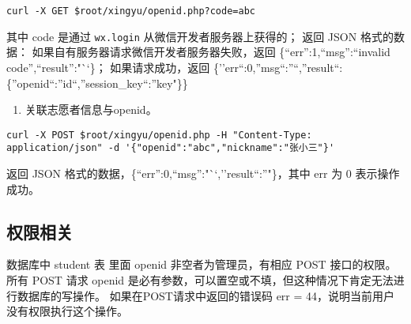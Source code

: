 \documentclass[]{article}
\providecommand{\tightlist}{%
  \setlength{\itemsep}{0pt}\setlength{\parskip}{0pt}}
\begin{document}
\begin{verbatim}
curl -X GET $root/xingyu/openid.php?code=abc
\end{verbatim}

其中 code 是通过 \texttt{wx.login} 从微信开发者服务器上获得的； 返回
JSON 格式的数据： 如果自有服务器请求微信开发者服务器失败，返回
\{``err'':1,``msg'':``invalid code'',``result'':"``\}；
如果请求成功，返回
\{''err``:0,''msg``:''``,''result``:\{''openid``:''id``,''session\_key``:''key"\}\}

\begin{enumerate}
\def\labelenumi{\arabic{enumi}.}
\setcounter{enumi}{1}
\tightlist
\item
  关联志愿者信息与openid。
\end{enumerate}

\begin{verbatim}
curl -X POST $root/xingyu/openid.php -H "Content-Type: application/json" -d '{"openid":"abc","nickname":"张小三"}'
\end{verbatim}

返回 JSON 格式的数据，\{``err'':0,``msg'':"``,''result``:''"\}，其中 err
为 0 表示操作成功。

\hypertarget{ux6743ux9650ux76f8ux5173}{%
\subsection{权限相关}\label{ux6743ux9650ux76f8ux5173}}

数据库中 student 表 里面 openid 非空者为管理员，有相应 POST 接口的权限。
所有 POST 请求 openid
是必有参数，可以置空或不填，但这种情况下肯定无法进行数据库的写操作。
如果在POST请求中返回的错误码 err =
44，说明当前用户没有权限执行这个操作。
\end{document}
